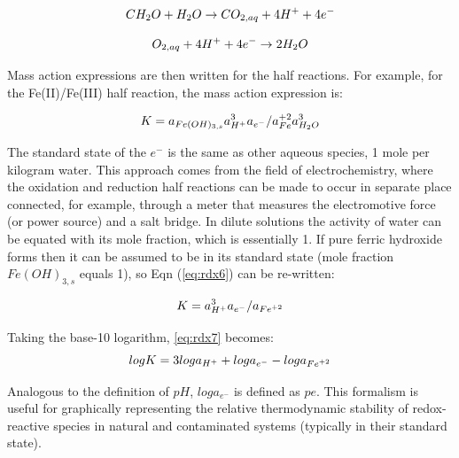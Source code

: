 \begin{equation}
CH_2O + H_2O \rightarrow CO_{2,aq} + 4H^+ + 4e^-  \\                    
\label{eq:om_half_reac}
\end{equation}

\begin{equation}
O_{2,aq} + 4H^+ + 4e^-  \rightarrow 2H_2O \\
\label{eq:ox_half_reac}
\end{equation}

Mass action expressions are then written for the half reactions.
For example, for the Fe(II)/Fe(III) half reaction, 
the mass action expression is:

\begin{equation}
K = a_{Fe(OH)_{3,s}} a_{H^+}^3 a_{e^-}/a_{Fe}^{+2} a_{H_2O}^3 \\
\label{eq:rdx6}
\end{equation}

The standard state of the $e^-$ is the same as other aqueous species,
1 mole per kilogram water.  
This approach comes from the field of electrochemistry, where the oxidation and 
reduction half reactions can be made to occur in separate place
connected, for example, 
through a meter that measures the electromotive force (or power source) 
and a salt bridge.
In dilute solutions the activity of water can be equated with its mole fraction,
which is essentially 1. If pure ferric hydroxide forms then it 
can be assumed to be in 
its standard state (mole fraction $Fe(OH)_{3,s}$
equals 1), 
so Eqn (\ref{eq:rdx6}) can be re-written:

\begin{equation}
K=a_{H^+}^3 a_{e^-}/a_{{Fe}^{+2}} \\    
\label{eq:rdx7}
\end{equation}
                                                         
Taking the base-10 logarithm, \ref{eq:rdx7} becomes: 
\begin{equation}
logK = 3loga_{H^+} + loga_{e^-} -loga_{{Fe}^{+2}}  \\                          
\label{eq:rdx8}
\end{equation}

Analogous to the definition of $pH$,
$loga_{e^-}$
is defined as $pe$.
This formalism is useful for graphically representing the 
relative thermodynamic stability of redox-reactive species 
in natural and contaminated systems 
(typically in their standard state).

